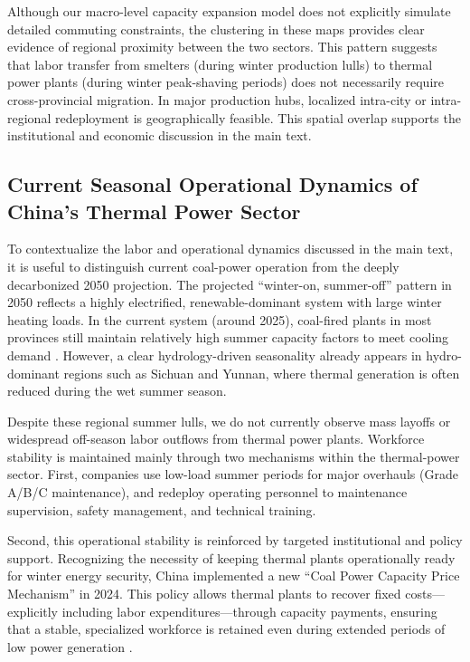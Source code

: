 \documentclass[preprint,12pt]{elsarticle}
\begin{document}
Although our macro-level capacity expansion model does not explicitly simulate detailed commuting constraints, the clustering in these maps provides clear evidence of regional proximity between the two sectors. This pattern suggests that labor transfer from smelters (during winter production lulls) to thermal power plants (during winter peak-shaving periods) does not necessarily require cross-provincial migration. In major production hubs, localized intra-city or intra-regional redeployment is geographically feasible. This spatial overlap supports the institutional and economic discussion in the main text.





\subsection{Current Seasonal Operational Dynamics of China's Thermal Power Sector}

To contextualize the labor and operational dynamics discussed in the main text, it is useful to distinguish current coal-power operation from the deeply decarbonized 2050 projection. The projected ``winter-on, summer-off'' pattern in 2050 reflects a highly electrified, renewable-dominant system with large winter heating loads. In the current system (around 2025), coal-fired plants in most provinces still maintain relatively high summer capacity factors to meet cooling demand \citep{rmi_sichuan_california_heat_2022}. However, a clear hydrology-driven seasonality already appears in hydro-dominant regions such as Sichuan and Yunnan, where thermal generation is often reduced during the wet summer season.

Despite these regional summer lulls, we do not currently observe mass layoffs or widespread off-season labor outflows from thermal power plants. Workforce stability is maintained mainly through two mechanisms within the thermal-power sector. First, companies use low-load summer periods for major overhauls (Grade A/B/C maintenance), and redeploy operating personnel to maintenance supervision, safety management, and technical training.

Second, this operational stability is reinforced by targeted institutional and policy support. Recognizing the necessity of keeping thermal plants operationally ready for winter energy security, China implemented a new ``Coal Power Capacity Price Mechanism'' in 2024. This policy allows thermal plants to recover fixed costs---explicitly including labor expenditures---through capacity payments, ensuring that a stable, specialized workforce is retained even during extended periods of low power generation \citep{hfzq_power_monthly_2024}.
\end{document}
